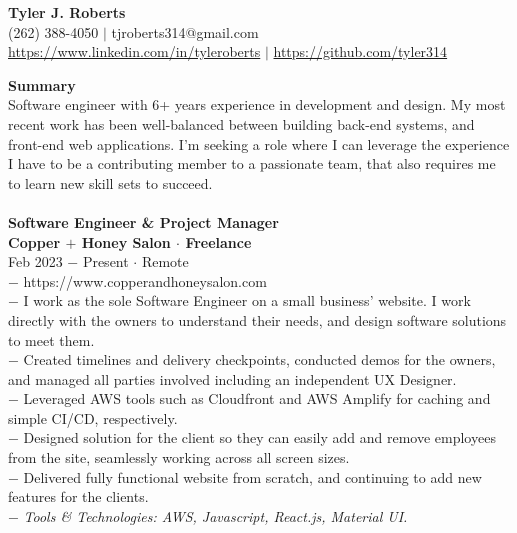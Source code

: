 \documentclass{resume}
\begin{document}
\begin{center}
{\LARGE \bf Tyler J. Roberts} \\[1mm]
\footnotesize
(262) 388-4050 $|$
tjroberts314@gmail.com \\[1mm]
\href{https://www.linkedin.com/in/tyleroberts}{https://www.linkedin.com/in/tyleroberts} $|$
\href{https://github.com/tyler314}{https://github.com/tyler314}
\end{center}
\begin{flushleft}

{\textbf{\large Summary}} \\
{
\scriptsize
\tab Software engineer with 6+ years experience in  development and design. My most recent work has been well-balanced between building back-end systems, and front-end  web applications. I'm seeking a role where I can leverage the experience I have to be a contributing member to a passionate team, that also requires me to learn new skill sets to succeed.
\\[4mm]
}
\\[2mm]

\normalsize{\bf Software Engineer \& Project Manager}\\
\footnotesize{\bf Copper $+$ Honey Salon $\cdot$ Freelance}\\
\footnotesize{Feb 2023 $-$ Present $\cdot$ Remote}\\[1mm]
{\scriptsize
	$-$ https://www.copperandhoneysalon.com\\
	$-$ I work as the sole Software Engineer on a small business' website. I work directly with the owners to understand their needs, and design software solutions to meet them.\\
	$-$ Created timelines and delivery checkpoints, conducted demos for the owners, and managed all parties involved including an independent UX Designer.\\
	$-$ Leveraged AWS tools such as Cloudfront and AWS Amplify for caching and simple CI/CD, respectively.\\
	$-$ Designed solution for the client so they can easily add and remove employees from the site, seamlessly working across all screen sizes.\\
	$-$ Delivered fully functional website from scratch, and continuing to add new features for the clients.\\
	$-$ \textit{Tools \& Technologies: AWS, Javascript, React.js, Material UI.}
}\\[3mm]


\end{flushleft}
\end{document}
